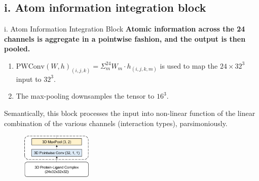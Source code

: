 \documentclass[aspectratio=169,xcolor=dvipsnames]{beamer}
\begin{document}
\subsection{i. Atom information integration block}
\begin{frame}{i. Atom Information Integration Block}
    \textbf{Atomic information across the 24 channels is aggregate in a 
    pointwise fashion, and the output is then pooled.}
    \begin{enumerate}
        \item $\text{PWConv}(W, h)_{(i, j, k)} = \Sigma_{m}^{24}W_m\cdot 
        h_{(i,j,k,m)}$ is used to map the $24\times32^3$ input to $32^3$.
        \item The max-pooling downsamples the tensor to $16^3$.
    \end{enumerate}
    Semantically, this block processes the input into non-linear function of 
    the linear combination of the various channels (interaction types), 
    parsimoniously.
    \begin{figure}
        \centering
        \includegraphics[width=0.3\textwidth]{images/aii_block}
    \end{figure}
\end{frame}
\end{document}
